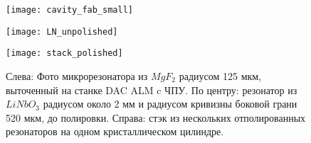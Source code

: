 \begin{figure}[ht]
  \begin{minipage}[ht]{0.33\linewidth}\centering
    \texttt{[image: cavity\_fab\_small]}
  \end{minipage}
  \hfill
  \begin{minipage}[ht]{0.32\linewidth}\centering
    \texttt{[image: LN\_unpolished]}
  \end{minipage}
  \hfill
  \begin{minipage}[ht]{0.32\linewidth}\centering
    \texttt{[image: stack\_polished]}
  \end{minipage}
  \caption{Слева: Фото микрорезонатора из $MgF_2$ радиусом 125 мкм, выточенный на станке DAC ALM c ЧПУ. По центру: резонатор из $LiNbO_3$ радиусом около 2 мм и радиусом кривизны боковой грани 520 мкм, до полировки. Справа: стэк из нескольких отполированных резонаторов на одном кристаллическом цилиндре.}
  \label{cavity_small}
\end{figure}




